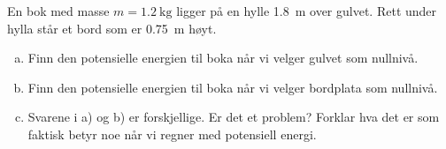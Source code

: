 %
En bok med masse $m = \SI{1.2}{\kilo\gram}$ ligger på en hylle \SI{1.8}{\metre} over gulvet. Rett under hylla står et bord som er \SI{0.75}{\metre} høyt.
\begin{enumerate}[a)]
    \item Finn den potensielle energien til boka når vi velger gulvet som nullnivå.
    \item Finn den potensielle energien til boka når vi velger bordplata som nullnivå.
    \item Svarene i a) og b) er forskjellige. Er det et problem? Forklar hva det er som faktisk betyr noe når vi regner med potensiell energi.
\end{enumerate}
